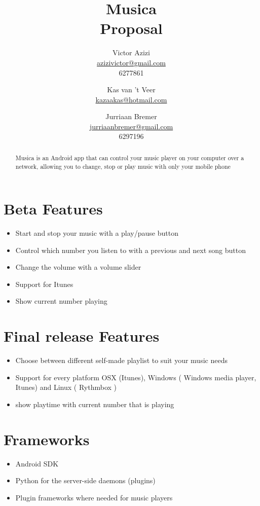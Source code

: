 \documentclass[a4paper, 13pt]{article}
\title{Musica \\ Proposal }
\author{Victor Azizi \\ \url{azizivictor@gmail.com} \\ 6277861 \and
        Kas van 't Veer \\ \url{kazaakas@hotmail.com} \\          \and
        Jurriaan Bremer \\ \url{jurriaanbremer@gmail.com} \\ 6297196
}
\begin{document}
\maketitle
\clearpage

\clearpage
\renewcommand{\abstractname}{Abstract}
\begin{abstract}
  Musica is an Android app that can control your music player on your computer
  over a network, allowing you to change, stop or play music with only your
  mobile phone
\end{abstract}

\section*{Beta Features}
    \begin{itemize}
     \item Start and stop your music with a play/pause button
     \item Control which number you listen to with a previous and next song button
     \item Change the volume with a volume slider 
     \item Support for Itunes
     \item Show current number playing
    \end{itemize}

\section*{Final release Features}
    \begin{itemize}
     \item Choose between different self-made playlist to suit your music needs
     \item Support for every platform OSX (Itunes), Windows ( Windows media
     player, Itunes) and Linux ( Rythmbox )
     \item show playtime with current number that is playing
    \end{itemize}

\section*{Frameworks}
    \begin{itemize}
     \item Android SDK
     \item Python for the server-side daemons (plugins)
     \item Plugin frameworks where needed for music players
    \end{itemize}
\end{document}
